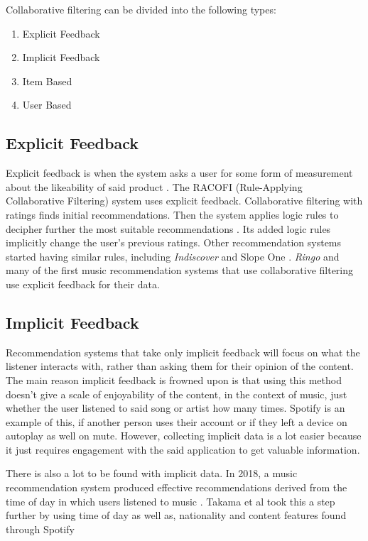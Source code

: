 Collaborative filtering can be divided into the following types:

\begin{enumerate}
	\item Explicit Feedback
	\item Implicit Feedback
	\item Item Based
	\item User Based
\end{enumerate}




\subsection{Explicit Feedback}

 Explicit feedback is when the system asks a user for some form of measurement about the likeability of said product \citep{celma_recommendation_2010}. The RACOFI (Rule-Applying Collaborative Filtering) system uses explicit feedback. Collaborative filtering with ratings finds initial recommendations. Then the system applies logic rules to decipher further the most suitable recommendations \citep{anderson_racofi_2003}.  Its added logic rules implicitly change the user’s previous ratings. Other recommendation systems started having similar rules, including \textit{Indiscover} and Slope One \citep{celma_music_2010} \citep{lemire_slope_2007}. \textit{Ringo} and many of the first music recommendation systems that use collaborative filtering use explicit feedback for their data. 

\subsection{Implicit Feedback}

Recommendation systems that take only implicit feedback will focus on what the listener interacts with, rather than asking them for their opinion of the content. The main reason implicit feedback is frowned upon is that using this method doesn't give a scale of enjoyability of the content, in the context of music, just whether the user listened to said song or artist how many times. Spotify is an example of this, if another person uses their account or if they left a device on autoplay as well on mute. However, collecting implicit data is a lot easier because it just requires engagement with the said application to get valuable information. 

There is also a lot to be found with implicit data. In 2018, a music recommendation system produced effective recommendations derived from the time of day in which users listened to music \citep{sanchez-moreno_incorporating_2018}. Takama et al took this a step further by using time of day as well as, nationality and content features found through Spotify \citep{takama_context-aware_2021} 

